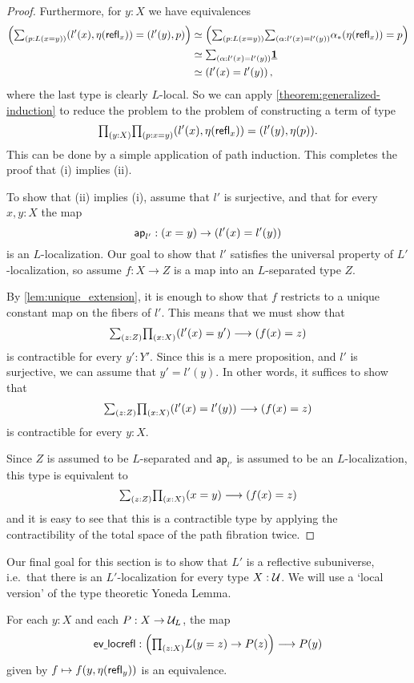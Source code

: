 \begin{proof}
Furthermore, for $y : X$ we have equivalences
\begin{align*}
    \left(\sm{p:L(x=y)}(l'(x),\eta(\refl{x}))=(l'(y),p)\right)
 & \eqvsym \left(\sm{p:L(x=y)}{\alpha:l'(x)=l'(y)} \trans{\alpha}{\eta(\refl{x})} = p \right) \\
 & \eqvsym \sm{\alpha:l'(x) = l'(y)} \unit \\
 & \eqvsym \left( l'(x) = l'(y) \right),
\end{align*}
where the last type is clearly $L$-local.
So we can apply \cref{theorem:generalized-induction} to reduce the problem to
the problem of constructing a term of type
\begin{equation*}
    \prd{y:X}{p:x=y}(l'(x),\eta(\refl{x}))=(l'(y),\eta(p)).
\end{equation*}
This can be done by a simple application of path induction. This completes the proof that (i) implies (ii).

To show that (ii) implies (i), assume that $l'$ is surjective, and that for every $x,y:X$ the map
\begin{equation*}
\mathsf{ap}_{l'}:(x=y)\to (l'(x)=l'(y))
\end{equation*}
is an $L$-localization. Our goal to show that $l'$ satisfies the universal property of $L'$-localization, so assume $f : X \to Z$ is a map into an $L$-separated type $Z$.

By \cref{lem:unique_extension}, it is enough to show that $f$ restricts to a unique constant map
on the fibers of $l'$. This means that we must show that
\[
  \sm{z:Z}\prd{x:X} (l'(x)=y') \lra (f(x)=z)
\]
is contractible for every $y':Y'$.
Since this is a mere proposition, and $l'$ is surjective, we can assume that
$y' = l'(y)$.  In other words, it suffices to show that
\[
  \sm{z:Z}\prd{x:X} (l'(x)=l'(y)) \lra (f(x)=z)
\]
is contractible for every $y:X$.

Since $Z$ is assumed to be $L$-separated and $\mathsf{ap}_{l'}$ is assumed to be an $L$-localization,
this type is equivalent to
\[
  \sm{z:Z}\prd{x:X} (x=y) \lra (f(x)=z)
\]
and it is easy to see that this is a contractible type by applying the contractibility of
the total space of the path fibration twice.
\end{proof}

Our final goal for this section is to show that $L'$ is a reflective subuniverse, i.e.~that there is an $L'$-localization for every type $X:\mathcal{U}$.
We will use a `local version' of the type theoretic Yoneda Lemma.

\begin{lem}\label{lemma:local_yoneda}
For each $y:X$ and each $P:X\to \mathcal{U}_L$, the map
\[
  \mathsf{ev\usc{}locrefl}:\Big(\prd{z:X}L(y=z)\to P(z)\Big) \lra P(y)
\]
given by $f\mapsto f(y,\eta(\mathsf{refl}_{y}))$ is an equivalence.
\end{lem}

